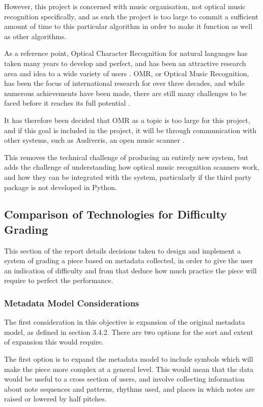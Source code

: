 However, this project is concerned with music organisation, not optical music recognition specifically, and as such the project is too large to commit a sufficient amount of time to this particular algorithm in order to make it function as well as other algorithms. 

As a reference point, Optical Character Recognition for natural languages has taken many years to develop and perfect, and has been an attractive research area and idea to a wide variety of users \parencite{InternationalConf}. OMR, or Optical Music Recognition, has been the focus of international research for over three decades, and while numerous achievements have been made, there are still many challenges to be faced before it reaches its full potential \parencite{musicocr}. 

It has therefore been decided that OMR as a topic is too large for this project, and if this goal is included in the project, it will be through communication with other systems, such as Audiveris, an open music scanner \parencite{audiveris}. 

This removes the technical challenge of producing an entirely new system, but adds the challenge of understanding how optical music recognition scanners work, and how they can be integrated with the system, particularly if the third party package is not developed in Python.

\subsection{Comparison of Technologies for Difficulty Grading}
This section of the report details decisions taken to design and implement a system of grading a piece based on metadata collected, in order to give the user an indication of difficulty and from that deduce how much practice the piece will require to perfect the performance.

\subsubsection{Metadata Model Considerations}
The first consideration in this objective is expansion of the original metadata model, as defined in section 3.4.2. There are two options for the sort and extent of expansion this would require.

The first option is to expand the metadata model to include symbols which will make the piece more complex at a general level. This would mean that the data would be useful to a cross section of users, and involve collecting information about note sequences and patterns, rhythms used, and places in which notes are raised or lowered by half pitches.

